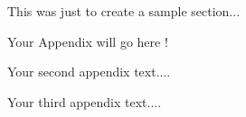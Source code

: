 \documentclass{iitthesis}
\begin{document}
This was just to create a sample section...

\clearpage


%
%

\appendix


Your Appendix will go here !

 \moretox


Your second appendix text....


Your third appendix text....
%
%




\end{document}
